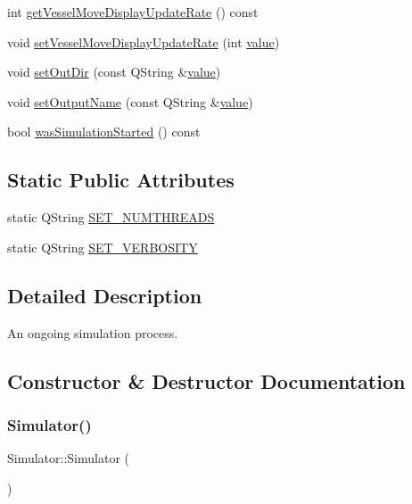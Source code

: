 \begin{DoxyCompactItemize}
\item 
int \mbox{\hyperlink{class_simulator_a49429cdd50f3d19d1b0456df42b97762}{get\+Vessel\+Move\+Display\+Update\+Rate}} () const
\item 
void \mbox{\hyperlink{class_simulator_ab73f41723e1046edfe9600462366733d}{set\+Vessel\+Move\+Display\+Update\+Rate}} (int \mbox{\hyperlink{diffusion_8cpp_a4b41795815d9f3d03abfc739e666d5da}{value}})
\item 
void \mbox{\hyperlink{class_simulator_a7abdeb99b1bd7d5784e09f68e5e7912a}{set\+Out\+Dir}} (const Q\+String \&\mbox{\hyperlink{diffusion_8cpp_a4b41795815d9f3d03abfc739e666d5da}{value}})
\item 
void \mbox{\hyperlink{class_simulator_a6e06309fae0c2341a81173eb084cf9c8}{set\+Output\+Name}} (const Q\+String \&\mbox{\hyperlink{diffusion_8cpp_a4b41795815d9f3d03abfc739e666d5da}{value}})
\item 
bool \mbox{\hyperlink{class_simulator_ac1336ca0d33dbb804fa5f4d6409a98e4}{was\+Simulation\+Started}} () const
\end{DoxyCompactItemize}
\subsection*{Static Public Attributes}
\begin{DoxyCompactItemize}
\item 
static Q\+String \mbox{\hyperlink{class_simulator_a7b69a3563727bc4210ca23939d341352}{S\+E\+T\+\_\+\+N\+U\+M\+T\+H\+R\+E\+A\+DS}}
\item 
static Q\+String \mbox{\hyperlink{class_simulator_aea6554545aab8c31486e9c883de8346d}{S\+E\+T\+\_\+\+V\+E\+R\+B\+O\+S\+I\+TY}}
\end{DoxyCompactItemize}


\subsection{Detailed Description}
An ongoing simulation process. 



\subsection{Constructor \& Destructor Documentation}
\mbox{\label{class_simulator_a031573bfcfe2e0f5c9539bcc1c7fc5d9}} 
\subsubsection{\texorpdfstring{Simulator()}{Simulator()}}
{\footnotesize\ttfamily Simulator\+::\+Simulator (\begin{DoxyParamCaption}{ }\end{DoxyParamCaption})}

